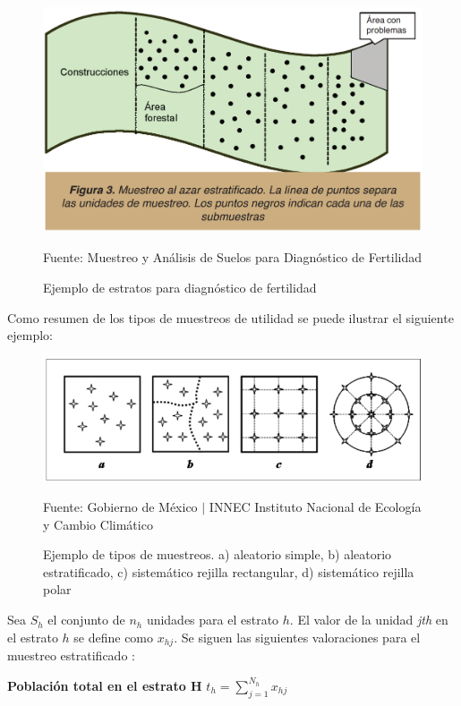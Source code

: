 \documentclass{report}
\begin{document}
\begin{figure}[H]
    \centering
    \includegraphics[width=0.5\paperwidth]{ref/stratified-sampling-examples.png}
    \caption{Ejemplo de estratos para diagnóstico de fertilidad}
    Fuente: Muestreo y Análisis de Suelos para Diagnóstico de Fertilidad \cite{lassaga-2011}
\end{figure}

Como resumen de los tipos de muestreos de utilidad se puede ilustrar el siguiente ejemplo:

\begin{figure}[H]
    \centering
    \includegraphics[width=0.5\paperwidth]{ref/kind-of-samplings-example.png}
    \caption{Ejemplo de tipos de muestreos. a) aleatorio simple, b) aleatorio estratificado, c) sistemático rejilla rectangular, d) sistemático rejilla polar}
    Fuente: Gobierno de México $\mid$ INNEC Instituto Nacional de Ecología y Cambio Climático \cite{innec-2007}
\end{figure}

Sea $S_h$ el conjunto de $n_h$ unidades para el estrato $h$. El valor de la unidad \textit{jth} en el estrato $h$ se define como $x_{hj}$. Se siguen las siguientes valoraciones para el muestreo estratificado \cite{lohr-2009}:

\bigbreak

\textbf{Población total en el estrato H}
\bigbreak
$t_h = \sum_{j=1}^{N_h} x_{hj}$
\end{document}
